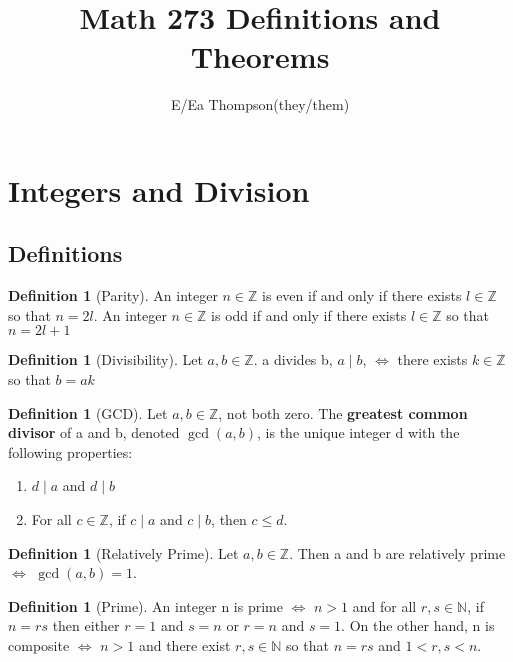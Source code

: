 \documentclass[12pt]{article}
\theoremstyle{definition}
\newtheorem{defn}[thm]{Definition}
\theoremstyle{remark}
\numberwithin{equation}{section}
\newcommand\Z{\mathbb Z}    %
\newcommand\N{\mathbb N}    %
\begin{document}

\title{Math 273 Definitions and Theorems}
\author{E/Ea Thompson(they/them)}
\maketitle

\tableofcontents



\section{Integers and Division}

\subsection{Definitions}


\begin{defn}[Parity]
        An integer $n \in \Z$ is even if and only if there exists $l \in \Z$ so that $n = 2l$. An integer $n \in \Z$ is odd if and only if there exists $l \in \Z$ so that $n = 2l + 1$
\end{defn}

\begin{defn}[Divisibility]
        Let $a,b \in \Z$.
        a divides b, $a\;\vert\;b$, $\iff$ there exists $k \in \Z$ so that $b = ak$
\end{defn}


\begin{defn}[GCD]
        Let $a,b \in \Z$, not both zero. The \textbf{greatest common divisor} of a and b, denoted $\gcd(a,b)$, is the unique integer d with the following properties:
        \begin{enumerate}
                \item $d\;\vert\;a$ and $d\;\vert\;b$
                \item For all $c \in \Z$, if $c\;\vert\;a$ and $c\;\vert\;b$, then $c \leq d$.
        \end{enumerate}
\end{defn}


\begin{defn}[Relatively Prime]
        Let $a,b \in \Z$. Then a and b are relatively prime $\iff$ $\gcd(a,b) = 1$.
\end{defn}


\begin{defn}[Prime]
        An integer n is prime $\iff$ $n > 1$ and for all $r,s \in \N$, if $n = rs$ then either $r = 1$ and $s = n$ or $r = n$ and $s= 1$. On the other hand, n is composite $\iff$ $n > 1$ and there exist $r,s \in \N$ so that $n = rs$ and $1 < r,s < n$.
\end{defn}
\end{document}
